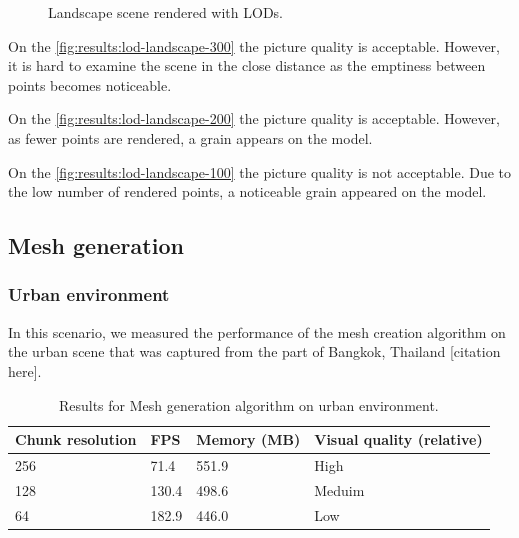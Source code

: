 \begin{figure}[h]
    \caption{Landscape scene rendered with LODs.}
\end{figure}

On the \autoref{fig:results:lod-landscape-300} the picture quality is acceptable. However, it is hard to examine the scene in the close distance as the emptiness between points becomes noticeable.

On the \autoref{fig:results:lod-landscape-200} the picture quality is acceptable. However, as fewer points are rendered, a grain appears on the model.

On the \autoref{fig:results:lod-landscape-100} the picture quality is not acceptable. Due to the low number of rendered points, a noticeable grain appeared on the model.


\subsection{Mesh generation}

\subsubsection{Urban environment}

In this scenario, we measured the performance of the mesh creation algorithm on the urban scene that was captured from the part of Bangkok, Thailand [citation here].

\begin{table}[htb]
    \centering
    \begin{tabular}{l|l|l|l}
    Chunk resolution & FPS & Memory (MB) & Visual quality (relative) \\ \hline
    256 & 71.4 & 551.9 & High \\
    128 & 130.4 & 498.6 & Meduim \\
    64 & 182.9 & 446.0 & Low
    \end{tabular}
    
    \caption{Results for Mesh generation algorithm on urban environment.}
    \label{tab:results:mesh-urban}
\end{table}

